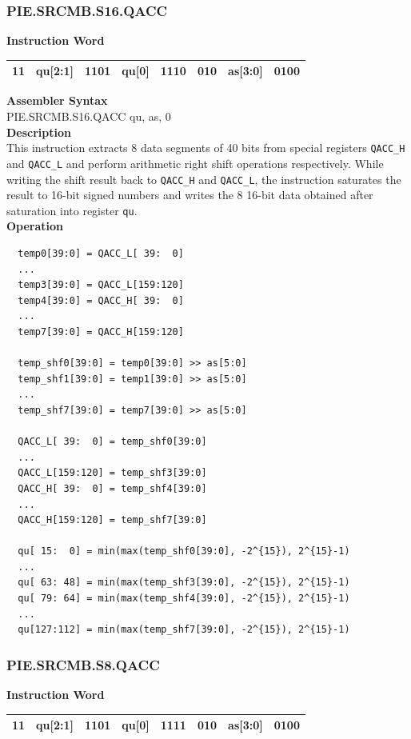 \newpage
\subsubsection{PIE.SRCMB.S16.QACC}\label{instruction:PIESRCMBS16QACC}
\setlength\tabcolsep{6pt}
\textbf{Instruction Word} \\
\begin{tabular}{|c|c|c|c|c|c|c|c|}
	\hline
	11 & qu[2:1] & 1101 & qu[0] & 1110 & 010 & as[3:0] & 0100 \\
	\hline
\end{tabular}

\textbf{Assembler Syntax} \\
PIE.SRCMB.S16.QACC qu, as, 0 \\
\textbf{Description} \\
This instruction extracts 8 data segments of 40 bits from special registers \lstinline{QACC_H} and \lstinline{QACC_L} and perform arithmetic right shift operations respectively. While writing the shift result back to \lstinline{QACC_H} and \lstinline{QACC_L}, the instruction saturates the result to 16-bit signed numbers and writes the 8 16-bit data obtained after saturation into register \lstinline{qu}.\\
\textbf{Operation}
\begin{lstlisting}
  temp0[39:0] = QACC_L[ 39:  0]
  ...
  temp3[39:0] = QACC_L[159:120]
  temp4[39:0] = QACC_H[ 39:  0]
  ...
  temp7[39:0] = QACC_H[159:120]

  temp_shf0[39:0] = temp0[39:0] >> as[5:0]
  temp_shf1[39:0] = temp1[39:0] >> as[5:0]
  ...
  temp_shf7[39:0] = temp7[39:0] >> as[5:0]

  QACC_L[ 39:  0] = temp_shf0[39:0]
  ...
  QACC_L[159:120] = temp_shf3[39:0]
  QACC_H[ 39:  0] = temp_shf4[39:0]
  ...
  QACC_H[159:120] = temp_shf7[39:0]

  qu[ 15:  0] = min(max(temp_shf0[39:0], -2^{15}), 2^{15}-1)
  ...
  qu[ 63: 48] = min(max(temp_shf3[39:0], -2^{15}), 2^{15}-1)
  qu[ 79: 64] = min(max(temp_shf4[39:0], -2^{15}), 2^{15}-1)
  ...
  qu[127:112] = min(max(temp_shf7[39:0], -2^{15}), 2^{15}-1)
\end{lstlisting}

\newpage
\subsubsection{PIE.SRCMB.S8.QACC}\label{instruction:PIESRCMBS8QACC}
\setlength\tabcolsep{6pt}
\textbf{Instruction Word} \\
\begin{tabular}{|c|c|c|c|c|c|c|c|}
	\hline
	11 & qu[2:1] & 1101 & qu[0] & 1111 & 010 & as[3:0] & 0100 \\
	\hline
\end{tabular}

